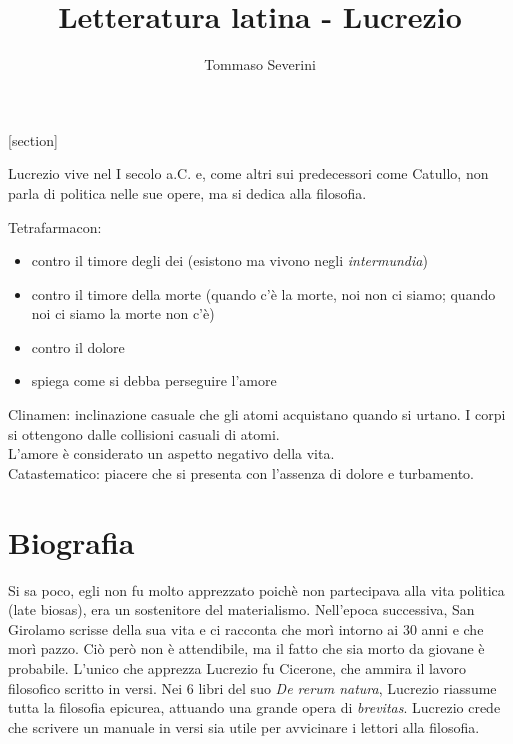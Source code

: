 \documentclass[10pt,a4paper]{article}
\author{Tommaso Severini}
\title{Letteratura latina -  Lucrezio}
\begin{document}
	\maketitle
	
	[section]
	
	Lucrezio vive nel I secolo a.C. e, come altri sui predecessori come Catullo, non parla di politica nelle sue opere, ma si dedica alla filosofia.
	
	Tetrafarmacon:
	\begin{itemize}
		\item contro il timore degli dei (esistono ma vivono negli \textit{intermundia})
		\item contro il timore della morte (quando c'è la morte, noi non ci siamo; quando noi ci siamo la morte non c'è)
		\item contro il dolore
		\item spiega come si debba perseguire l'amore
	\end{itemize}

	Clinamen: inclinazione casuale che gli atomi acquistano quando si urtano.
	I corpi si ottengono dalle collisioni casuali di atomi. \\
	
	L'amore è considerato un aspetto negativo della vita. \\
	
	Catastematico: piacere che si presenta con l'assenza di dolore e turbamento. \\
	
	\section{Biografia}
	
	Si sa poco, egli non fu molto apprezzato poichè non partecipava alla vita politica (late biosas), era un sostenitore del materialismo. Nell'epoca successiva, San Girolamo scrisse della sua vita e ci racconta che morì intorno ai 30 anni e che morì pazzo. Ciò però non è attendibile, ma il fatto che sia morto da giovane è probabile. L'unico che apprezza Lucrezio fu Cicerone, che ammira il lavoro filosofico scritto in versi. Nei 6 libri del suo \textit{De rerum natura}, Lucrezio riassume tutta la filosofia epicurea, attuando una grande opera di \textit{brevitas}. Lucrezio crede che scrivere un manuale in versi sia utile per avvicinare i lettori alla filosofia.
	
\end{document}
